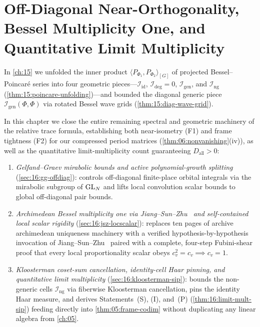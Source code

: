 \chapter{Off-Diagonal Near-Orthogonality, Bessel Multiplicity One, and Quantitative Limit Multiplicity}
\label{ch:16}

In \cref{ch:15} we unfolded the inner product $\langle P_{\Phi_1}, P_{\Phi_2} \rangle_{[G]}$ of projected Bessel--Poincar\'e series into four geometric pieces—$\mathcal{I}_{\mathrm{id}}$, $\mathcal{I}_{\mathrm{deg}} = 0$, $\mathcal{I}_{\mathrm{gen}}$, and $\mathcal{I}_{\mathrm{ng}}$ (\cref{thm:15:poincare-unfolding})—and bounded the diagonal generic piece $\mathcal{I}_{\mathrm{gen}}(\Phi, \Phi)$ via rotated Bessel wave grids (\cref{thm:15:diag-wave-grid}).

In this chapter we close the entire remaining spectral and geometric machinery of the relative trace formula, establishing both near-isometry (F1) and frame tightness (F2) for our compressed period matrices (\cref{thm:06:nonvanishing}(iv)), as well as the quantitative limit-multiplicity count guaranteeing $D_{\mathrm{all}} > 0$:
\begin{enumerate}[label=(\roman*)]
\item \emph{Gelfand--Graev mirabolic bounds and active polynomial-growth splitting} (\cref{sec:16:gg-offdiag}): controls off-diagonal finite-place orbital integrals via the mirabolic subgroup of $\mathrm{GL}_N$ and lifts local convolution scalar bounds to global off-diagonal pair bounds.
\item \emph{Archimedean Bessel multiplicity one via Jiang--Sun--Zhu~\cite{JiangSunZhu2010} and self-contained local scalar rigidity} (\cref{sec:16:jsz-locscalar}): replaces ten pages of archive archimedean uniqueness machinery with a verified hypothesis-by-hypothesis invocation of Jiang--Sun--Zhu~\cite[Theorem~A]{JiangSunZhu2010} paired with a complete, four-step Fubini-shear proof that every local proportionality scalar obeys $c_v^2 = c_v \implies c_v = 1$.
\item \emph{Kloosterman coset-sum cancellation, identity-cell Haar pinning, and quantitative limit multiplicity} (\cref{sec:16:kloosterman-sip}): bounds the non-generic cells $\mathcal{I}_{\mathrm{ng}}$ via fiberwise Kloosterman cancellation, pins the identity Haar measure, and derives Statements~(S), (I), and~(P) (\cref{thm:16:limit-mult-sip}) feeding directly into \cref{thm:05:frame-codim} without duplicating any linear algebra from \cref{ch:05}.
\end{enumerate}

